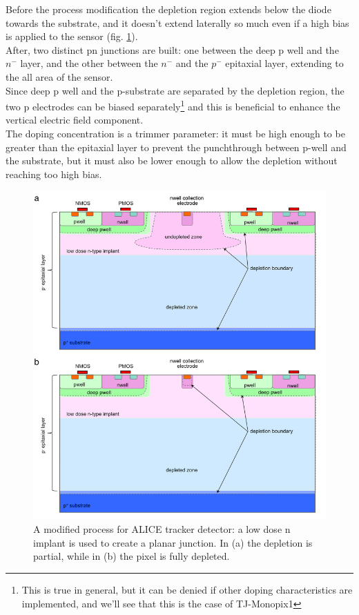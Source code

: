       Before the process modification the depletion region extends below the diode towards the substrate, and it doesn't extend laterally so much even if a high bias is applied to the sensor (fig. \ref{fig:modified_process}). \\
      After, two distinct pn junctions are built: one between the deep p well and the $n^-$ layer, and the other between the $n^-$ and the $p^-$ epitaxial layer, extending to the all area of the sensor.\\ 
      Since deep p well and the p-substrate are separated by the depletion region, the two p electrodes can be biased separately\footnote{This is true in general, but it can be denied if other doping characteristics are implemented, and we'll see that this is the case of TJ-Monopix1} and this is beneficial to enhance the vertical electric field component.\\
      The doping concentration is a trimmer parameter: it must be high enough to be greater than the epitaxial layer to prevent the punchthrough between p-well and the substrate, but it must also be lower enough to allow the depletion without reaching too high bias.
      \begin{figure}
         \centering
         \includegraphics[width=.7\linewidth]{figures/Pixel_detectors/modified_process.png}
         \caption{A modified process for ALICE tracker detector: a low dose n implant is used to create a planar junction. In (a) the depletion is partial, while in (b) the pixel is fully depleted.}
         \label{fig:modified_process}
      \end{figure}

